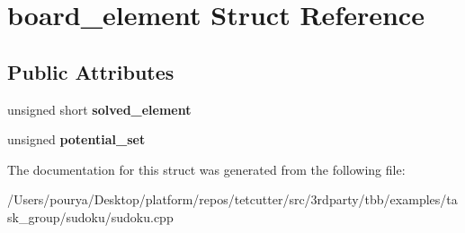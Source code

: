 \hypertarget{structboard__element}{}\section{board\+\_\+element Struct Reference}
\label{structboard__element}
\subsection*{Public Attributes}
\begin{DoxyCompactItemize}
\item 
\hypertarget{structboard__element_a9bdd983436c8a03b34401217a95650b7}{}unsigned short {\bfseries solved\+\_\+element}\label{structboard__element_a9bdd983436c8a03b34401217a95650b7}

\item 
\hypertarget{structboard__element_a61d7cbbe011c52bbd08a6cae73f70c9a}{}unsigned {\bfseries potential\+\_\+set}\label{structboard__element_a61d7cbbe011c52bbd08a6cae73f70c9a}

\end{DoxyCompactItemize}


The documentation for this struct was generated from the following file\+:\begin{DoxyCompactItemize}
\item 
/\+Users/pourya/\+Desktop/platform/repos/tetcutter/src/3rdparty/tbb/examples/task\+\_\+group/sudoku/sudoku.\+cpp\end{DoxyCompactItemize}
